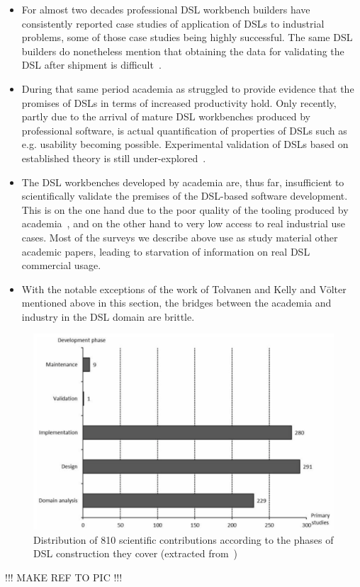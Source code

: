 \documentclass{article}
\begin{document}
\begin{itemize}
  \item For almost two decades professional DSL workbench builders have
  consistently reported case studies of application of DSLs to industrial
  problems, some of those case studies being highly successful.
  The same DSL builders do nonetheless mention that obtaining the data for
  validating the DSL after shipment is difficult~\cite{Tolvanen018}.
  \item During that same period academia as struggled to provide evidence that
  the promises of DSLs in terms of increased productivity hold. Only recently,
  partly due to the arrival of mature DSL workbenches produced by professional
  software, is actual quantification of properties of DSLs such as e.g.
  usability becoming possible. Experimental validation of DSLs based on
  established theory is still under-explored~\cite{Mernik17}.
  \item The DSL workbenches developed by academia are, thus far, insufficient to
  scientifically validate the premises of the DSL-based software development.
  This is on the one hand due to the poor quality of the tooling
  produced by academia~\cite{TolvanenKelly2016}, and on the other hand to very
  low access to real industrial use cases. Most of the surveys we describe above use as study
  material other academic papers, leading to starvation of information on real
  DSL commercial usage.
  \item With the notable exceptions of the work of Tolvanen and Kelly and
  Völter mentioned above in this section, the bridges between the academia and
  industry in the DSL domain are brittle. 
\end{itemize}

\begin{figure}[!h]
\centering 
\includegraphics[width=1\textwidth]{./figures/DSL_design_phases}
\caption{Distribution of 810 scientific contributions according to the phases
of DSL construction they cover (extracted from~\cite{Mernik17})}
\label{fig:DSL_design_phases}
\end{figure}
!!! MAKE REF TO PIC !!!
\end{document}
